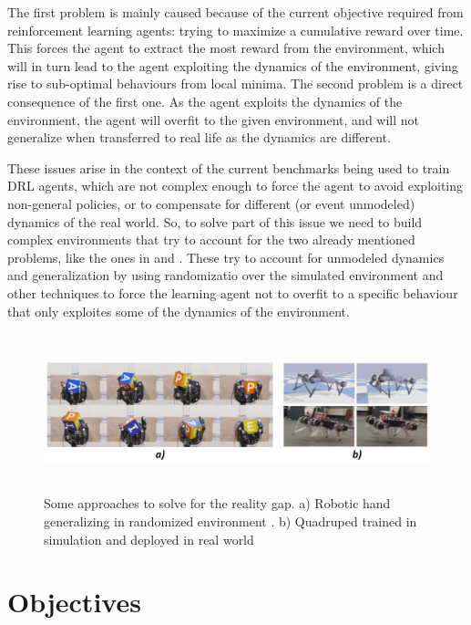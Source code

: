 The first problem is mainly caused because of the current objective required from reinforcement learning agents: trying to maximize
a cumulative reward over time. This forces the agent to extract the most reward from the environment, which will in
turn lead to the agent exploiting the dynamics of the environment, giving rise to sub-optimal behaviours from local minima.
The second problem is a direct consequence of the first one. As the agent exploits the dynamics of the environment, the agent will overfit
to the given environment, and will not generalize when transferred to real life as the dynamics are different.

These issues arise in the context of the current benchmarks being used to train DRL agents, which are not complex enough to
force the agent to avoid exploiting non-general policies, or to compensate for different (or event unmodeled) dynamics of the real world.
So, to solve part of this issue we need to build complex environments that try to account for the two already mentioned problems, like the ones
in \citeauthor{simtoreal-quadruped} and \citeauthor{dexterity-openai}. These try to account for unmodeled dynamics and generalization by
using randomizatio over the simulated environment and other techniques to force the learning agent not to overfit to a specific behaviour that
only exploites some of the dynamics of the environment.


\begin{figure}[!ht]
	\centering
	\includegraphics[width=6.0in,height=1.8in]{./chapters/imgs/img_reality_gap_approaches.png}
	\caption[Reality gap approaches]{Some approaches to solve for the reality gap. 
		a) Robotic hand generalizing in randomized environment \citep{dexterity-openai}.
		b) Quadruped trained in simulation and deployed in real world \citep{simtoreal-quadruped} }
	\label{fig:reality-gap-approaches}
\end{figure}

\section{Objectives}
\label{sec:objectives}

